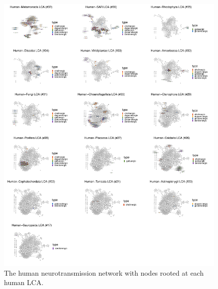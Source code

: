 \begin{figure}

{\centering \includegraphics{figs/analysis.network.unnamed-chunk-15-1} 

}

\caption{The human neurotransmission network with nodes rooted at each human LCA.}\label{fig:unnamed-chunk-15}
\end{figure}

\begin{Shaded}
\end{Shaded}

